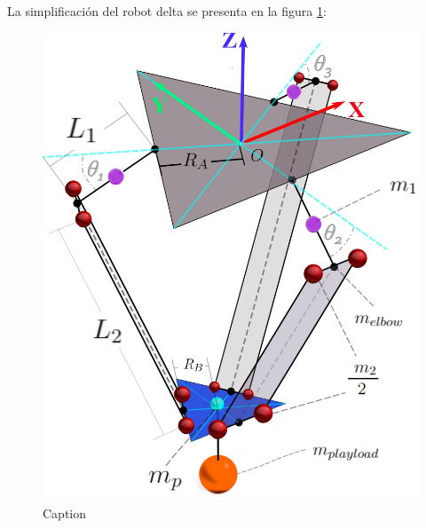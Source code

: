     \newpage
    
     La simplificación del robot delta se presenta en la figura \ref{fig:cap5_1}:
    
    \begin{figure}[htb]
        \centering
        \includegraphics[width=0.91\linewidth]{Main/Chapter5/Images5/DIBUJO55.jpg}
        \caption{Caption}
        \label{fig:cap5_1}
    \end{figure}
    
    
    